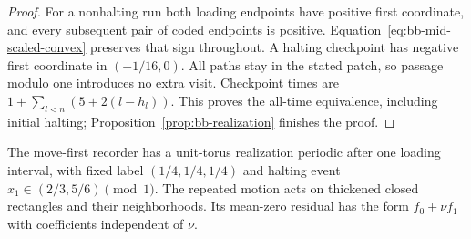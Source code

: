 \begin{proof}
For a nonhalting run both loading endpoints have positive first
coordinate, and every subsequent pair of coded endpoints is positive.
Equation~\eqref{eq:bb-mid-scaled-convex} preserves that sign throughout.
A halting checkpoint has negative first coordinate in $(-1/16,0)$.
All paths stay in the stated patch, so passage modulo one introduces
no extra visit.  Checkpoint times are
$1+\sum_{l<n}(5+2(l-h_l))$.  This proves the all-time equivalence,
including initial halting; Proposition~\ref{prop:bb-realization}
finishes the proof.
\end{proof}

\begin{proposition}
\label{prop:bb-mid-direct-torus}
The move-first recorder has a unit-torus realization periodic after
one loading interval, with fixed label $(1/4,1/4,1/4)$ and halting
event $x_1\in(2/3,5/6)\pmod1$.  The repeated motion acts on thickened
closed rectangles and their neighborhoods.  Its mean-zero residual
has the form $f_0+\nu f_1$ with coefficients independent of $\nu$.
\end{proposition}
